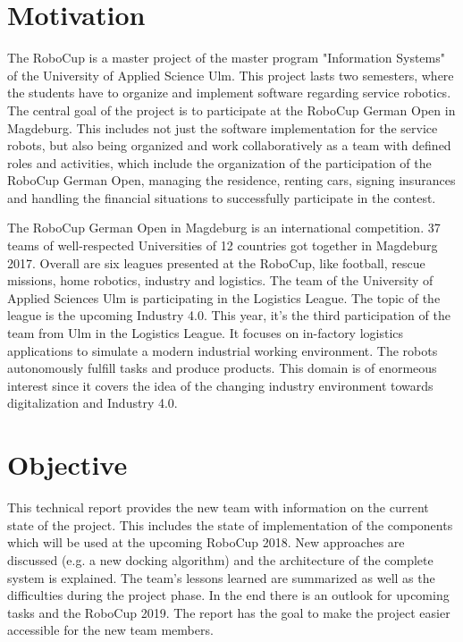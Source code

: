 \section{Motivation}

The RoboCup is a master project of the master program "Information Systems" of the University of Applied Science Ulm. This project lasts two semesters, where the students have to organize and implement software regarding service robotics. The central goal of the project is to participate at the RoboCup German Open in Magdeburg. This includes not just the software implementation for the service robots, but also being organized and work collaboratively as a team with defined roles and activities, which include the organization of the participation of the RoboCup German Open, managing the residence, renting cars, signing insurances and handling the financial situations to successfully participate in the contest. 

The RoboCup German Open in Magdeburg is an international competition. 37 teams of well-respected Universities of 12 countries got together in Magdeburg 2017. Overall are six leagues presented at the RoboCup, like football, rescue missions, home robotics, industry and logistics. The team of the University of Applied Sciences Ulm is participating in the Logistics League. The topic of the league is the upcoming Industry 4.0. This year, it's the third participation of the team from Ulm in the Logistics League. It focuses on in-factory logistics applications to simulate a modern industrial working environment. The robots autonomously fulfill tasks and produce products. This domain is of enormeous interest since it covers the idea of the changing industry environment towards digitalization and Industry 4.0. 

\section{Objective}

This technical report provides the new team with information on the current state of the project. This includes the state of implementation of the components which will be used at the upcoming RoboCup 2018. New approaches are discussed (e.g. a new docking algorithm) and the architecture of the complete system is explained. The team's lessons learned are summarized as well as the difficulties during the project phase. In the end there is an outlook for upcoming tasks and the RoboCup 2019.
The report has the goal to make the project easier accessible for the new team members.  
